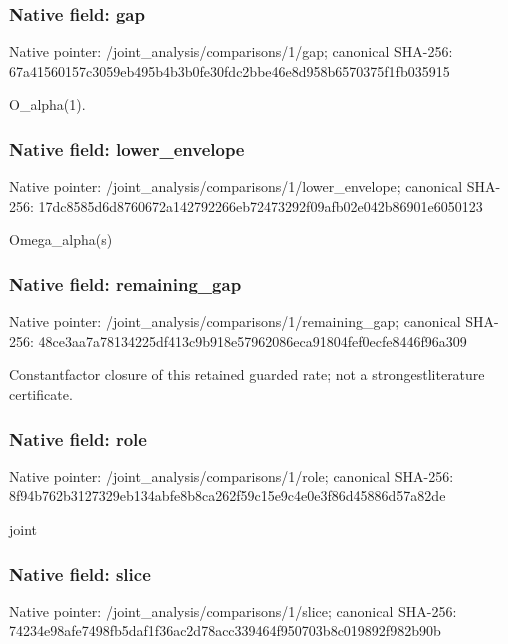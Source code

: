 \documentclass[10pt,a4paper]{article}
\begin{document}
\subsubsection{Native field: gap}


Native pointer: /joint\_analysis/comparisons/1/gap; canonical SHA-256: 67a41560157c3059eb495b4b\allowbreak{}3b0fe30fdc2bbe46e8d958b6\allowbreak{}570375f1fb035915


O\_alpha(1).


\subsubsection{Native field: lower\_envelope}


Native pointer: /joint\_analysis/comparis\allowbreak{}ons/1/lower\_envelope; canonical SHA-256: 17dc8585d6d8760672a14279\allowbreak{}2266eb72473292f09afb02e0\allowbreak{}42b86901e6050123


Omega\_alpha(s)


\subsubsection{Native field: remaining\_gap}


Native pointer: /joint\_analysis/comparis\allowbreak{}ons/1/remaining\_gap; canonical SHA-256: 48ce3aa7a78134225df413c9\allowbreak{}b918e57962086eca91804fef\allowbreak{}0ecfe8446f96a309


Constantfactor closure of this retained guarded rate; not a strongestliterature certificate.


\subsubsection{Native field: role}


Native pointer: /joint\_analysis/comparisons/1/role; canonical SHA-256: 8f94b762b3127329eb134abf\allowbreak{}e8b8ca262f59c15e9c4e0e3f\allowbreak{}86d45886d57a82de


joint


\subsubsection{Native field: slice}


Native pointer: /joint\_analysis/comparisons/1/slice; canonical SHA-256: 74234e98afe7498fb5daf1f3\allowbreak{}6ac2d78acc339464f950703b\allowbreak{}8c019892f982b90b
\end{document}
